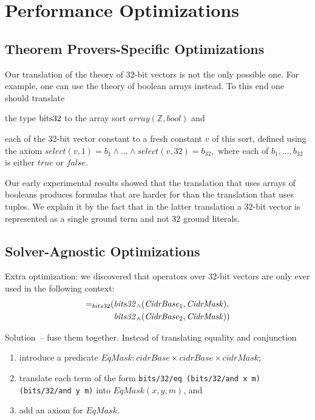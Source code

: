 \section{Performance Optimizations}\label{sect:aws/optimizations}
\subsection{Theorem Provers-Specific Optimizations}
Our translation of the theory of 32-bit vectors is not the only possible one. For example, one can use the theory of boolean arrays instead. To this end one should translate
\begin{enumerate*}[label=(\roman*)]
  \item the type $\mathrm{bits32}$ to the array sort $\mathit{array}(\mathbb{Z},\mathit{bool})$ and
  \item each of the 32-bit vector constant to a fresh constant $v$ of this sort, defined using the axiom $\mathit{select}(v,1)=b_1\wedge\ldots\wedge\mathit{select}(v, 32)=b_{32},$ where each of $b_1,\ldots,b_{32}$ is either $\mathit{true}$ or $\mathit{false}$.
\end{enumerate*}
Our early experimental results showed that the translation that uses arrays of booleans produces formulas that are harder for \vampire than the translation that uses tuples. We explain it by the fact that in the latter translation a 32-bit vector is represented as a single ground term and not 32 ground literals.

\subsection{Solver-Agnostic Optimizations}
Extra optimization: we discovered that operators over 32-bit vectors are only ever used in the following context:
\begin{equation*}
\begin{aligned}
\mathit{=}_{bits32}(&\mathit{bits32}_{\wedge}(\mathit{CidrBase}_1,\mathit{CidrMask}), \\
                   &\mathit{bits32}_{\wedge}(\mathit{CidrBase}_2,\mathit{CidrMask}))
\end{aligned}
\end{equation*}

Solution~-- fuse them together. Instead of translating equality and conjunction
\begin{enumerate}
  \item introduce a predicate $\mathit{EqMask}: \mathit{cidrBase}\times\mathit{cidrBase}\times\mathit{cidrMask}$;
  \item translate each term of the form \texttt{bits/32/eq (bits/32/and x m) (bits/32/and y m)} into $\mathit{EqMask}(x, y, m)$, and
  \item add an axiom for $\mathit{EqMask}$.
\end{enumerate}

